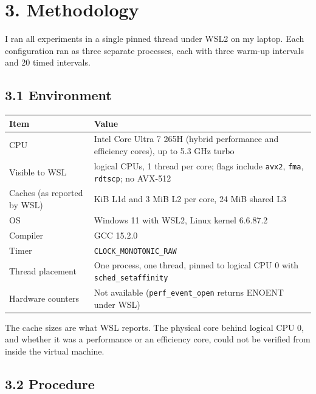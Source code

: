 \documentclass[10pt,letterpaper]{article}
\begin{document}
\section*{3. Methodology}

I ran all experiments in a single pinned thread under WSL2 on my laptop. Each configuration ran as three separate processes, each with three warm-up intervals and 20 timed intervals.


\subsection*{3.1 Environment}

{\footnotesize\begin{longtable}{>{\raggedright\arraybackslash}p{0.3263\dimexpr\linewidth-4\tabcolsep\relax}>{\raggedright\arraybackslash}p{0.6737\dimexpr\linewidth-4\tabcolsep\relax}}\toprule
\textbf{Item} & \textbf{Value} \\ \midrule\endhead
CPU & Intel Core Ultra 7 265H (hybrid performance and efficiency cores), up to 5.3 GHz turbo \\
Visible to WSL & 16 logical CPUs, 1 thread per core; flags include \texttt{avx2}, \texttt{fma}, \texttt{rdtscp}; no AVX-512 \\
Caches (as reported by WSL) & 48 KiB L1d and 3 MiB L2 per core, 24 MiB shared L3 \\
OS & Windows 11 with WSL2, Linux kernel 6.6.87.2 \\
Compiler & GCC 15.2.0 \\
Timer & \texttt{CLOCK\_MONOTONIC\_RAW} \\
Thread placement & One process, one thread, pinned to logical CPU 0 with \texttt{sched\_setaffinity} \\
Hardware counters & Not available (\texttt{perf\_event\_open} returns ENOENT under WSL) \\
\bottomrule\end{longtable}}

The cache sizes are what WSL reports. The physical core behind logical CPU 0, and whether it was a performance or an efficiency core, could not be verified from inside the virtual machine.


\subsection*{3.2 Procedure}
\end{document}
